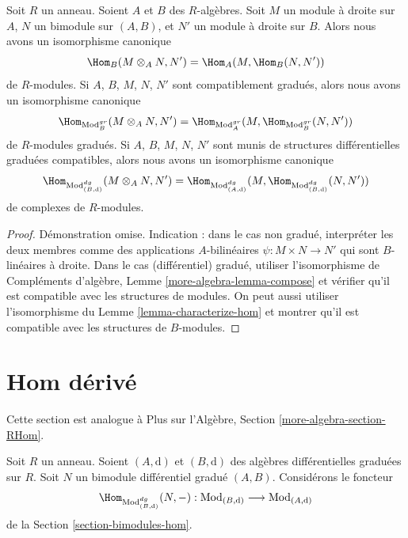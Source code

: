 \begin{lemma}
\label{lemma-tensor-hom-adjunction}
Soit $R$ un anneau. Soient $A$ et $B$ des $R$-algèbres. Soit $M$ un module à
droite sur $A$, $N$ un bimodule sur $(A, B)$, et $N'$ un module à droite sur $B$.
Alors nous avons un isomorphisme canonique
$$
\Hom_B(M \otimes_A N, N') = \Hom_A(M, \Hom_B(N, N'))
$$
de $R$-modules. Si $A$, $B$, $M$, $N$, $N'$ sont compatiblement gradués, alors
nous avons un isomorphisme canonique
$$
\Hom_{\text{Mod}_B^{gr}}(M \otimes_A N, N') =
\Hom_{\text{Mod}_A^{gr}}(M, \Hom_{\text{Mod}_B^{gr}}(N, N'))
$$
de $R$-modules gradués. Si $A$, $B$, $M$, $N$, $N'$ sont munis de structures différentielles graduées
compatibles, alors nous avons un isomorphisme canonique
$$
\Hom_{\text{Mod}^{dg}_{(B, \text{d})}}(M \otimes_A N, N') =
\Hom_{\text{Mod}^{dg}_{(A, \text{d})}}(M,
\Hom_{\text{Mod}^{dg}_{(B, \text{d})}}(N, N'))
$$
de complexes de $R$-modules.
\end{lemma}

\begin{proof}
Démonstration omise. Indication : dans le cas non gradué, interpréter les deux membres
comme des applications $A$-bilinéaires $\psi : M \times N \to N'$ qui sont
$B$-linéaires à droite. Dans le cas (différentiel) gradué, utiliser l'isomorphisme
de Compléments d'algèbre, Lemme \ref{more-algebra-lemma-compose} et vérifier qu'il
est compatible avec les structures de modules. On peut aussi utiliser
l'isomorphisme du Lemme \ref{lemma-characterize-hom} et montrer qu'il est
compatible avec les structures de $B$-modules.
\end{proof}







\section{Hom dérivé}
\label{section-restriction}

\noindent
Cette section est analogue à Plus sur l'Algèbre, Section
\ref{more-algebra-section-RHom}.

\medskip\noindent
Soit $R$ un anneau. Soient $(A, \text{d})$ et $(B, \text{d})$ des algèbres
différentielles graduées sur $R$. Soit $N$ un bimodule différentiel gradué $(A,
B)$. Considérons le foncteur
\begin{equation}
\label{equation-restriction}
\Hom_{\text{Mod}^{dg}_{(B, \text{d})}}(N, -) :
\text{Mod}_{(B, \text{d})}
\longrightarrow
\text{Mod}_{(A, \text{d})}
\end{equation}
de la Section \ref{section-bimodules-hom}.

